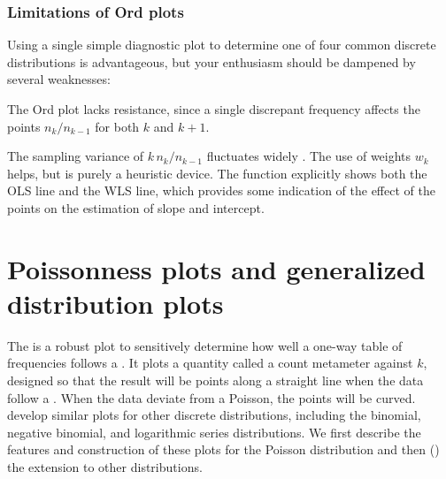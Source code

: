 \documentclass[10pt,krantz2]{krantz}\usepackage[]{graphicx}\usepackage[]{color}
\begin{document}
\subsubsection{Limitations of Ord plots}
Using a single simple diagnostic plot to determine one of four common discrete
distributions is advantageous, but your enthusiasm should be
dampened by several weaknesses:

\begin{itemize*}
\item The Ord plot lacks resistance, since a single discrepant
       frequency affects the points $n_k / n_{k-1}$
       for both \(k\) and \(k  +  1\).

\item The sampling variance of \(k \,  n_k /  n_{k-1}\) fluctuates
       widely
       \citep{HoaglinTukey:85,JinkinsonSlater:81}.
       The use of weights \(w_k\) helps, but is purely a
       heuristic device. The  function explicitly shows both
       the OLS line and the WLS line, which provides some indication of the
       effect of the points on the estimation of slope and intercept.
\end{itemize*}




\section{Poissonness plots and generalized distribution plots}\label{sec:discrete-Poissonness}


The 
\citep{Hoaglin:80}
is a robust plot to sensitively determine how well a
one-way table of frequencies follows a .
It plots a quantity called a count metameter
against \(k\), designed
so that the result will be points along a
straight line when the data follow a .  When the
data deviate from a Poisson, the points will be curved.
\citet{HoaglinTukey:85}
develop similar plots for other discrete distributions,
including the binomial, negative binomial, and logarithmic series
distributions.  We first describe the features and construction
of these plots for the Poisson distribution and then ()
the extension to other distributions.


\end{document}
